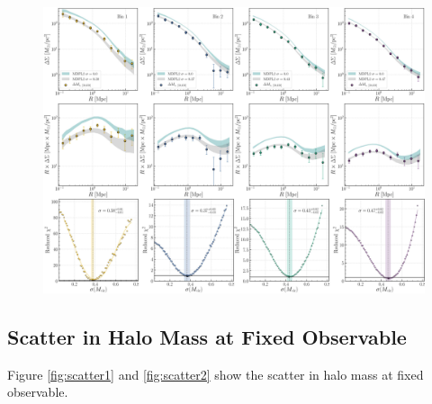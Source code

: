 \documentclass[a4paper,fleqn,usenatbib]{mnras}
\begin{document}
       
  \begin{figure}
      \centering 
      \includegraphics[width=\textwidth]{fig/small/topn_mout6_mdpl2}
      \caption{
          }
      \label{fig:fitting}
  \end{figure}
    
    

\subsection{Scatter in Halo Mass at Fixed Observable}

Figure \ref{fig:scatter1} and \ref{fig:scatter2} show the scatter in halo mass at fixed observable.
\end{document}

